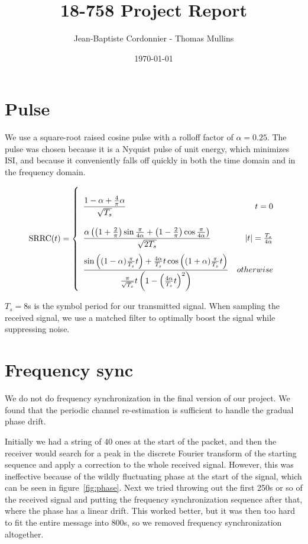 \documentclass{article}
\begin{document}
\title{18-758 Project Report}
\author{Jean-Baptiste Cordonnier - Thomas Mullins}
\date{\today}
\maketitle


\section{Pulse}

We use a square-root raised cosine pulse with a rolloff factor of $\alpha =
0.25$. The pulse was chosen because it is a Nyquist pulse of unit energy, which
minimizes ISI, and because it conveniently falls off quickly in both the time
domain and in the frequency domain.

\[
  \text{SRRC}(t) = \left\{
    \def\arraystretch{3.2}
    \begin{array}{lr}
      \dfrac{1 - \alpha + \frac{4}{\pi}\alpha}{\sqrt{T_s}} & t = 0 \\
      \dfrac{\alpha \left(
        \left(1 + \frac{2}{\pi}\right) \sin{\frac{\pi}{4\alpha}} +
        \left(1 - \frac{2}{\pi}\right) \cos{\frac{\pi}{4\alpha}}
      \right)}{\sqrt{2T_s}} & |t| = \frac{T_s}{4\alpha} \\
      \dfrac{
        \sin{\left((1-\alpha)\frac{\pi}{T_s}t\right)} +
        \frac{4\alpha}{T_s}t\cos{\left((1+\alpha)\frac{\pi}{T_s}t\right)}
      }{
        \frac{\pi}{\sqrt{T_s}}t
        \left(1-\left(\frac{4\alpha}{T_s}t\right)^2\right)
      } & otherwise
    \end{array}
  \right.
\]

$T_s = 8$\textmu s is the symbol period for our transmitted signal. When
sampling the received signal, we use a matched filter to optimally boost the
signal while suppressing noise.

\section{Frequency sync}

We do not do frequency synchronization in the final version of our project. We
found that the periodic channel re-estimation is sufficient to handle the
gradual phase drift.

Initially we had a string of 40 ones at the start of the packet, and then the
receiver would search for a peak in the discrete Fourier transform of the
starting sequence and apply a correction to the whole received signal. However,
this was ineffective because of the wildly fluctuating phase at the start of the
signal, which can be seen in figure~\ref{fig:phase}. Next we tried throwing out
the first 250\textmu s or so of the received signal and putting the frequency
synchronization sequence after that, where the phase has a linear drift. This
worked better, but it was then too hard to fit the entire message into
800\textmu s, so we removed frequency synchronization altogether.
\end{document}

